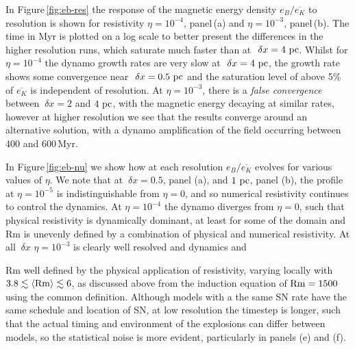 \documentclass[preprint2]{aastex63}
\newcommand\Rm{{\rm Rm} }
\newcommand\SNr{\dot\sigma_{\rm sn}}
\newcommand\pc{~ {\rm pc}}
\newcommand\dx{~ {\delta x}}
\begin{document}
In Figure\,\ref{fig:eb-res} the response of the magnetic energy density 
$e_B/\overline{e_K}$ to resolution is shown for resistivity $\eta=10^{-4}$,
panel\,(a) and $\eta=10^{-3}$, panel\,(b).
The time in Myr is plotted on a log scale to better present the differences in 
the higher resolution runs, which saturate much faster than at $\dx=4\pc$.
Whilst for $\eta=10^{-4}$ the dynamo growth rates are very slow at $\dx=4\pc$,
the growth rate shows some convergence near $\dx=0.5\pc$ and the saturation
level of above 5\% of $\overline{e_K}$ is independent of resolution.
At $\eta=10^{-3}$, there is a \emph{false convergence} \citep{FMA91} between
$\dx=2$ and $4\pc$, with the magnetic energy decaying at similar rates, however
at higher resolution we see that the results converge around an alternative
solution, with a dynamo amplification of the field occurring between 400 and
600\,Myr.

In Figure\,\ref{fig:eb-nu} we show how at each resolution $e_B/\overline{e_K}$
evolves for various values of $\eta$.
We note that at $\dx=0.5$, panel (a), and $1\pc$, panel (b), the profile at
$\eta=10^{-5}$ is indistinguishable from $\eta=0$, and so numerical resistivity
continues to control the dynamics.
At $\eta=10^{-4}$ the dynamo diverges from $\eta=0$, such that physical
resistivity is dynamically dominant, at least for some of the domain and Rm is
unevenly defined by a combination of physical and numerical resistivity.
At all $\dx$ $\eta=10^{-3}$ is clearly well resolved and dynamics and

Rm well defined by the physical application of resistivity, varying locally with
$3.8\lesssim\langle\Rm\rangle\lesssim6$, as discussed above from the induction
equation of $\Rm=1500$ using the common definition. 
Although models with a the same SN rate have the same schedule and location of
SN, at low resolution the timestep is longer, such that the actual timing and 
environment of the explosions can differ between models, so the statistical
noise is more evident, particularly in panels (e) and (f).
\end{document}
